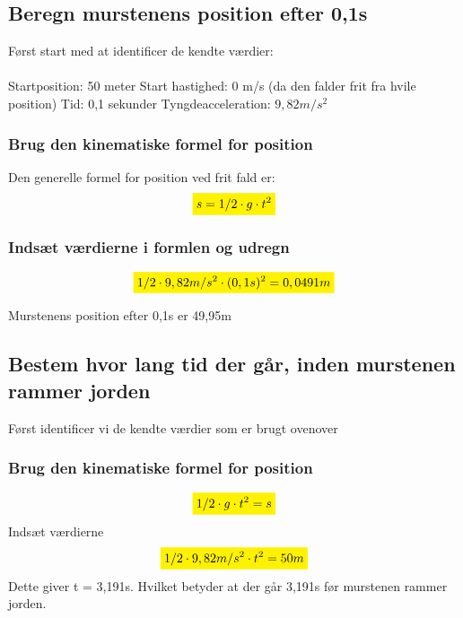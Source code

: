 \subsection{Beregn murstenens position efter 0,1s}
Først start med at identificer de kendte værdier:
\\\\
Startposition: 50 meter \newline
Start hastighed: 0 m/s (da den falder frit fra hvile position)\newline
Tid: 0,1 sekunder \newline
Tyngdeacceleration: \begin{math}9,82m/s^{2}\end{math}


\subsubsection{Brug den kinematiske formel for position}
Den generelle formel for position ved frit fald er:
\begin{equation*}
    \mathcolorbox{yellow}{s=1/2 \cdot g \cdot t^{2}}
\end{equation*}

\subsubsection{Indsæt værdierne i formlen og udregn}
\begin{equation*}
    \mathcolorbox{yellow}{1/2 \cdot 9,82m/s^{2} \cdot (0,1s)^{2}=0,0491m}
\end{equation*}

Murstenens position efter 0,1s er 49,95m

\subsection{Bestem hvor lang tid der går, inden murstenen rammer jorden}

Først identificer vi de kendte værdier som er brugt ovenover

\subsubsection{Brug den kinematiske formel for position}
\begin{equation*}
    \mathcolorbox{yellow}{1/2\cdot g\cdot t^{2}=s}
\end{equation*}
Indsæt værdierne
\begin{equation*}
    \mathcolorbox{yellow}{1/2\cdot9,82m/s^{2}\cdot t^{2}=50m}
\end{equation*}
Dette giver t = 3,191s. Hvilket betyder at der går 3,191s før murstenen rammer jorden.

